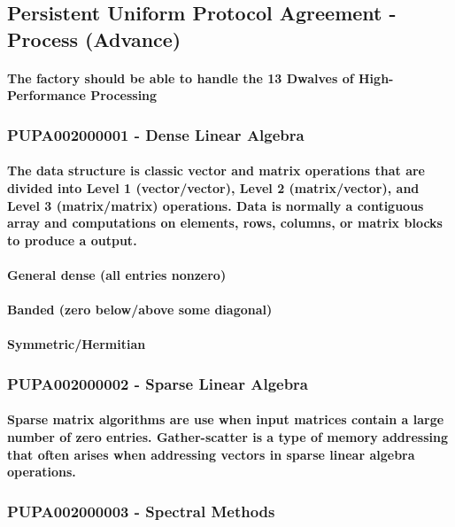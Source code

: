 \documentclass{acm_proc_article-sp}
\begin{document}
\subsection{Persistent Uniform Protocol Agreement - Process (Advance)}
\paragraph{ The factory should be able to handle the 13 Dwalves of High-Performance Processing \cite{asanovic2006landscape}}
\subsubsection{PUPA002000001 - Dense Linear Algebra}
\paragraph{The data structure is classic vector and matrix operations that are divided into Level 1 (vector/vector), Level 2 (matrix/vector), and Level 3 (matrix/matrix) operations. Data is normally a contiguous array and computations on elements, rows, columns, or matrix blocks to produce a output.}
\paragraph{General dense (all entries nonzero)}
\paragraph{Banded (zero below/above some diagonal)}
\paragraph{Symmetric/Hermitian}
\subsubsection{PUPA002000002 - Sparse Linear Algebra}
\paragraph{Sparse matrix algorithms are use when input matrices contain a large number of zero entries. Gather-scatter is a type of memory addressing that often arises when addressing vectors in sparse linear algebra operations.}
\subsubsection{PUPA002000003 - Spectral Methods}
\end{document}
